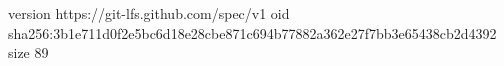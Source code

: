 version https://git-lfs.github.com/spec/v1
oid sha256:3b1e711d0f2e5bc6d18e28cbe871c694b77882a362e27f7bb3e65438cb2d4392
size 89
